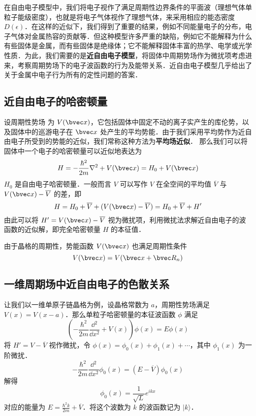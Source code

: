 

在自由电子模型中，我们将电子视作了满足周期性边界条件的平面波（理想气体单粒子能级密度），也就是将电子气体视作了理想气体，来采用相应的能态密度 $D(\epsilon)$．在这样的近似下，我们得到了重要的结果，例如不同能量电子的分布，电子气体对金属热容的贡献等．但这种模型许多严重的缺陷，例如它不能解释为什么有些固体是金属，而有些固体是绝缘体；它不能解释固体丰富的热学、电学或光学性质．为此，我们需要的是\textbf{近自由电子模型}，将固体中周期势场作为微扰项考虑进来，考察周期势场下的电子波函数的行为及能带关系．近自由电子模型几乎给出了关于金属中电子行为所有的定性问题的答案．
\subsection{近自由电子的哈密顿量}
设周期性势场 为 $V(\bvec x)$，它包括固体中固定不动的离子实产生的库伦势，以及固体中的巡游电子在 $\bvec x$ 处产生的平均势能．由于我们采用平均势作为近自由电子所受到的势能的近似，我们常称这种方法为\textbf{平均场近似}．
那么我们可以将固体中一个电子的哈密顿量可以近似地表达为
\begin{equation}
H=-\frac{\hbar^2}{2m}\nabla^2+V(\bvec x)=H_0+V(\bvec x)
\end{equation}
$H_0$ 是自由电子哈密顿量．一般而言 $V$ 可以写作 $V$ 在全空间的平均值 $\overline V$ 与 $V(\bvec x)-\overline V$ 的差，即
\begin{equation}
H=H_0+\overline V+(V(\bvec x)-\overline V)=H_0+\overline V+H'
\end{equation}
由此可以将 $H'=V(\bvec x)-\overline V$ 视为微扰项，利用微扰法求解近自由电子的波函数的近似解，即完全哈密顿量 $H$ 的本征值．

由于晶格的周期性，势能函数 $V(\bvec x)$ 也满足周期性条件
\begin{equation}
V(\bvec x)=V(\bvec x+\bvec R_n)
\end{equation}
\subsection{一维周期场中近自由电子的色散关系}
让我们以一维单原子链晶格为例，设晶格常数为 $a$，周期性势场满足 $V(x)=V(x-a)$．那么单粒子哈密顿量的本征波函数 $\phi$ 满足
\begin{equation}\label{egasmd_eq1}
\left(-\frac{\hbar^2}{2m}\frac{\dd{}^2}{\dd x^2}+V(x)\right)\phi(x)=E\phi(x)
\end{equation}
将 $H'=V-\overline V$ 视作微扰，令 $\phi(x)=\phi_0(x)+\phi_1(x)+\cdots$，其中 $\phi_1(x)$ 为一阶微扰．
\begin{equation}
-\frac{\hbar^2}{2m}\frac{\dd{}^2}{\dd x^2} \phi_0(x)=(E-\overline V)\phi_0(x)
\end{equation}
解得
\begin{equation}
\phi_0(x)=\frac{1}{\sqrt{L}}e^{ikx}
\end{equation}
对应的能量为 $E=\frac{\hbar^2 k}{2m}+\overline V$．将这个波数为 $k$ 的波函数记为 $|k\rangle$．

